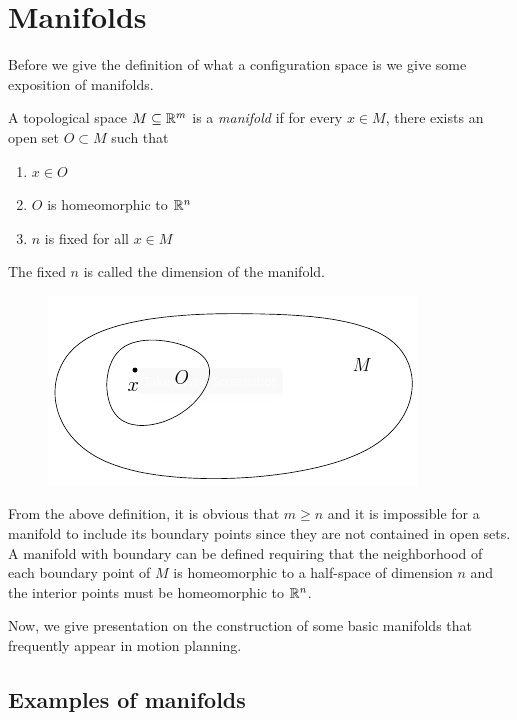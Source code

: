 \section{Manifolds}
Before we give the definition of what a configuration space is we give some exposition of manifolds.
\begin{defn}
    A topological space $M \subseteq \mathbb{R}^m$ is a \textit{manifold} if for every $x \in M$, there exists an open set $O \subset M$ such that
    \begin{enumerate}
        \item $x \in O$
        \item $O$ is homeomorphic to $\mathbb{R}^n$
        \item $n$ is fixed for all $x \in M$
    \end{enumerate}
    The fixed $n$ is called the dimension of the manifold.
    \begin{figure}[H]
        \centering
        \includegraphics[scale=.95]{images/manifold}
    \end{figure}
\end{defn}

From the above definition, it is obvious that $m \ge n$ and it is impossible for a manifold to include its boundary points since they are not contained in open sets.
\linebreak
A manifold with boundary can be defined requiring that the neighborhood of each boundary point of $M$ is homeomorphic to a half-space of dimension $n$ and the interior points must be homeomorphic to $\mathbb{R}^n$.

Now, we give presentation on the construction of some basic manifolds that frequently appear in motion planning.

\subsection{Examples of manifolds}

